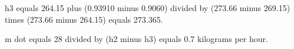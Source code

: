 h3 equals 264.15 plus (0.93910 minus 0.9060) divided by (273.66 minus 269.15) times (273.66 minus 264.15) equals 273.365.  

m dot equals 28 divided by (h2 minus h3) equals 0.7 kilograms per hour.
